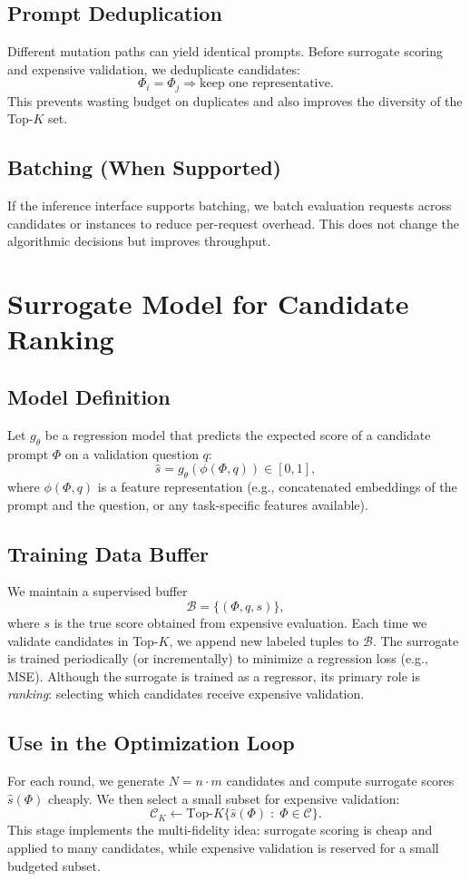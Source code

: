 \subsection{Prompt Deduplication}
Different mutation paths can yield identical prompts. Before surrogate scoring and expensive validation, we deduplicate candidates:
\[
\Phi_i = \Phi_j \Rightarrow \text{keep one representative}.
\]
This prevents wasting budget on duplicates and also improves the diversity of the Top-$K$ set.

\subsection{Batching (When Supported)}
If the inference interface supports batching, we batch evaluation requests across candidates or instances to reduce per-request overhead. This does not change the algorithmic decisions but improves throughput.

\section{Surrogate Model for Candidate Ranking}
\subsection{Model Definition}
Let $g_\theta$ be a regression model that predicts the expected score of a candidate prompt $\Phi$ on a validation question $q$:
\[
\widehat{s} = g_\theta(\phi(\Phi,q)) \in [0,1],
\]
where $\phi(\Phi,q)$ is a feature representation (e.g., concatenated embeddings of the prompt and the question, or any task-specific features available).

\subsection{Training Data Buffer}
We maintain a supervised buffer
\[
\mathcal{B} = \{(\Phi, q, s)\},
\]
where $s$ is the true score obtained from expensive evaluation. Each time we validate candidates in Top-$K$, we append new labeled tuples to $\mathcal{B}$. The surrogate is trained periodically (or incrementally) to minimize a regression loss (e.g., MSE). Although the surrogate is trained as a regressor, its primary role is \emph{ranking}: selecting which candidates receive expensive validation.

\subsection{Use in the Optimization Loop}
For each round, we generate $N=n\cdot m$ candidates and compute surrogate scores $\widehat{s}(\Phi)$ cheaply. We then select a small subset for expensive validation:
\[
\mathcal{C}_K \leftarrow \text{Top-}K\{\widehat{s}(\Phi)\;:\;\Phi\in\mathcal{C}\}.
\]
This stage implements the multi-fidelity idea: surrogate scoring is cheap and applied to many candidates, while expensive validation is reserved for a small budgeted subset.

